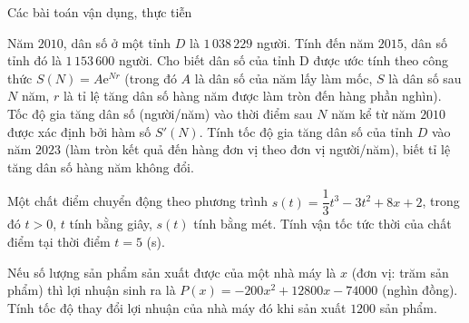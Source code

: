 \begin{dang}{Các bài toán vận dụng, thực tiễn}
\end{dang}

\begin{vd}%
	Năm $2010$, dân số ở một tỉnh $D$ là $1\,038\,229$ người. Tính đến năm $2015$, dân số tỉnh đó là $1\,153\,600$ người. Cho biết dân số của tỉnh D được ước tính theo công thức $S(N)=A\mathrm{e}^{Nr}$ (trong đó $A$ là dân số của năm lấy làm mốc, $S$ là dân số sau $N$ năm, $r$ là tỉ lệ tăng dân số hàng năm được làm tròn đến hàng phần nghìn). Tốc độ gia tăng dân số (người/năm) vào thời điểm sau $N$ năm kể từ năm $2010$ được xác định bởi hàm số $S'(N)$. Tính tốc độ gia tăng dân số của tỉnh $D$ vào năm $2023$ (làm tròn kết quả đến hàng đơn vị theo đơn vị người/năm), biết tỉ lệ tăng dân số hàng năm không đổi.
\end{vd} 

\begin{vd}%
	Một chất điểm chuyển động theo phương trình $s(t)=\dfrac{1}{3}t^3-3t^2+8x+2$, trong đó $t>0$, $t$ tính bằng giây, $s(t)$ tính bằng mét. Tính vận tốc tức thời của chất điểm tại thời điểm $t=5$ (s).
\end{vd} 

\begin{vd}%
	Nếu số lượng sản phẩm sản xuất được của một nhà máy là $x$ (đơn vị: trăm sản phẩm) thì lợi nhuận sinh ra là $P(x)=-200x^2+ 12800x-74000$ (nghìn đồng). Tính tốc độ thay đổi lợi nhuận của nhà máy đó khi sản xuất  $1200$ sản phẩm.
\end{vd} 

